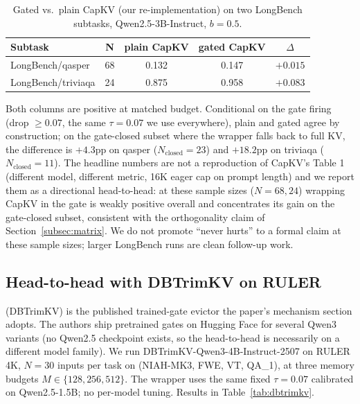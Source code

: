 \documentclass{article} %
\begin{document}
\begin{table}[h]
\centering
\caption{Gated vs.\ plain CapKV (our re-implementation) on two
LongBench subtasks, Qwen2.5-3B-Instruct, $b = 0.5$.}
\label{tab:capkv}
\begin{tabular}{lcccc}
\toprule
Subtask & N & plain CapKV & gated CapKV & $\Delta$ \\
\midrule
LongBench/qasper   & 68 & 0.132 & 0.147 & $+0.015$ \\
LongBench/triviaqa & 24 & 0.875 & 0.958 & $+0.083$ \\
\bottomrule
\end{tabular}
\end{table}

Both columns are positive at matched budget. Conditional on the gate
firing (drop $\geq 0.07$, the same $\tau = 0.07$ we use everywhere),
plain and gated agree by construction; on the gate-closed subset where
the wrapper falls back to full KV, the difference is $+4.3$pp on qasper
($N_{\text{closed}} = 23$) and $+18.2$pp on triviaqa
($N_{\text{closed}} = 11$). The headline numbers are not a reproduction
of CapKV's Table 1 (different model, different metric, 16K eager cap on
prompt length) and we report them as a directional head-to-head: at
these sample sizes ($N = 68, 24$) wrapping CapKV in the gate is
weakly positive overall and concentrates its gain on the gate-closed
subset, consistent with the orthogonality claim of
Section~\ref{subsec:matrix}. We do not promote ``never hurts'' to a
formal claim at these sample sizes; larger LongBench runs are clean
follow-up work.

\subsection{Head-to-head with DBTrimKV on RULER}
\label{subsec:dbtrimkv}

\citet{arxiv260509649} (DBTrimKV) is the published trained-gate evictor
the paper's mechanism section adopts. The authors ship pretrained gates
on Hugging Face for several Qwen3 variants (no Qwen2.5 checkpoint
exists, so the head-to-head is necessarily on a different model
family). We run DBTrimKV-Qwen3-4B-Instruct-2507 on RULER 4K, $N = 30$
inputs per task on (NIAH-MK3, FWE, VT, QA\_1), at three memory budgets
$M \in \{128, 256, 512\}$. The wrapper uses the same fixed
$\tau = 0.07$ calibrated on Qwen2.5-1.5B; no per-model tuning.
Results in Table~\ref{tab:dbtrimkv}.
\end{document}
